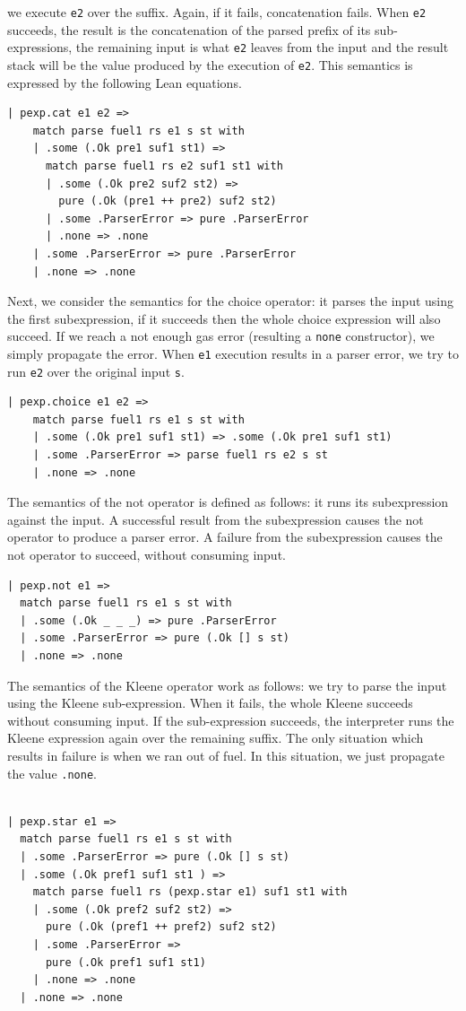 \documentclass[preprint,12pt]{elsarticle}
\theoremstyle{definition}
\begin{document}
we execute \lstinline|e2| over the suffix. Again, if it fails, concatenation
fails. When \lstinline|e2| succeeds, the result is the concatenation of
the parsed prefix of its sub-expressions, the remaining input is what
\lstinline|e2| leaves from the input and the result stack will be the value
produced by the execution of \lstinline|e2|. This semantics is expressed by
the following Lean equations.
\begin{lstlisting}
| pexp.cat e1 e2 =>
    match parse fuel1 rs e1 s st with
    | .some (.Ok pre1 suf1 st1) =>
      match parse fuel1 rs e2 suf1 st1 with
      | .some (.Ok pre2 suf2 st2) =>
        pure (.Ok (pre1 ++ pre2) suf2 st2)
      | .some .ParserError => pure .ParserError
      | .none => .none
    | .some .ParserError => pure .ParserError
    | .none => .none
\end{lstlisting}
Next, we consider the semantics for the choice operator: it parses the input
using the first subexpression, if it succeeds then the whole choice expression
will also succeed. If we reach a not enough gas error
(resulting a \lstinline|none| constructor), we simply propagate the error.
When \lstinline|e1| execution results in a parser error, we try to run
\lstinline|e2| over the original input \lstinline|s|.
\begin{lstlisting}
| pexp.choice e1 e2 =>
    match parse fuel1 rs e1 s st with
    | .some (.Ok pre1 suf1 st1) => .some (.Ok pre1 suf1 st1)
    | .some .ParserError => parse fuel1 rs e2 s st
    | .none => .none
\end{lstlisting}
The semantics of the not operator is defined as follows: it runs
its subexpression against the input. A successful result from the
subexpression causes the not operator to produce a parser error.
A failure from the subexpression causes the not operator to succeed,
without consuming input.
\begin{lstlisting}
| pexp.not e1 =>
  match parse fuel1 rs e1 s st with
  | .some (.Ok _ _ _) => pure .ParserError
  | .some .ParserError => pure (.Ok [] s st)
  | .none => .none
\end{lstlisting}
The semantics of the Kleene operator work as follows: we try to parse
the input using the Kleene sub-expression. When it fails, the whole
Kleene succeeds without consuming input. If the sub-expression succeeds,
the interpreter runs the Kleene expression again over the remaining suffix.
The only situation which results in failure is when we ran out of fuel. In this
situation, we just propagate the value \lstinline|.none|.
\begin{lstlisting}

| pexp.star e1 =>
  match parse fuel1 rs e1 s st with
  | .some .ParserError => pure (.Ok [] s st)
  | .some (.Ok pref1 suf1 st1 ) =>
    match parse fuel1 rs (pexp.star e1) suf1 st1 with
    | .some (.Ok pref2 suf2 st2) =>
      pure (.Ok (pref1 ++ pref2) suf2 st2)
    | .some .ParserError =>
      pure (.Ok pref1 suf1 st1)
    | .none => .none
  | .none => .none
\end{lstlisting}
\end{document}
